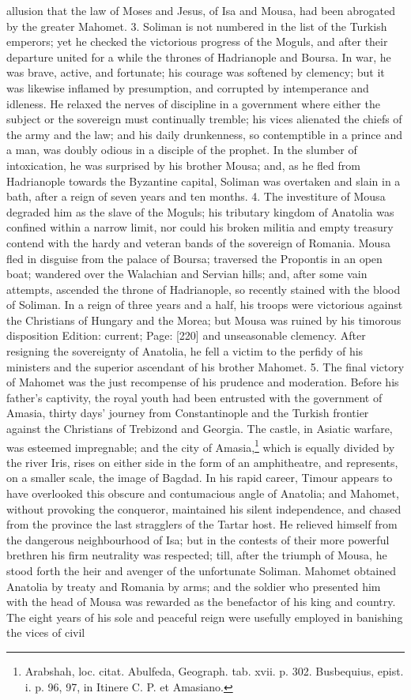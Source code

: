 allusion that the law of Moses and Jesus, of Isa and Mousa, had been abrogated by the greater Mahomet. 3. Soliman is not numbered in the list of the Turkish emperors; yet he checked the victorious progress of the Moguls, and after their departure united for a while the thrones of Hadrianople and Boursa. In war, he was brave, active, and fortunate; his courage was softened by clemency; but it was likewise inflamed by presumption, and corrupted by intemperance and idleness. He relaxed the nerves of discipline in a government where either the subject or the sovereign must continually tremble; his vices alienated the chiefs of the army and the law; and his daily drunkenness, so contemptible in a prince and a man, was doubly odious in a disciple of the prophet. In the slumber of intoxication, he was surprised by his brother Mousa; and, as he fled from Hadrianople towards the Byzantine capital, Soliman was overtaken and slain in a bath, after a reign of seven years and ten months. 4. The investiture of Mousa degraded him as the slave of the Moguls; his tributary kingdom of Anatolia was confined within a narrow limit, nor could his broken militia and empty treasury contend with the hardy and veteran bands of the sovereign of Romania. Mousa fled in disguise from the palace of Boursa; traversed the Propontis in an open boat; wandered over the Walachian and Servian hills; and, after some vain attempts, ascended the throne of Hadrianople, so recently stained with the blood of Soliman. In a reign of three years and a half, his troops were victorious against the Christians of Hungary and the Morea; but Mousa was ruined by his timorous disposition Edition: current; Page: [220] and unseasonable clemency. After resigning the sovereignty of Anatolia, he fell a victim to the perfidy of his ministers and the superior ascendant of his brother Mahomet. 5. The final victory of Mahomet was the just recompense of his prudence and moderation. Before his father\texthebrew{}’s captivity, the royal youth had been entrusted with the government of Amasia, thirty days\texthebrew{}’ journey from Constantinople and the Turkish frontier against the Christians of Trebizond and Georgia. The castle, in Asiatic warfare, was esteemed impregnable; and the city of Amasia,\footnote{Arabshah, loc. citat. Abulfeda, Geograph. tab. xvii. p. 302. Busbequius, epist. i. p. 96, 97, in Itinere C. P. et Amasiano.} which is equally divided by the river Iris, rises on either side in the form of an amphitheatre, and represents, on a smaller scale, the image of Bagdad. In his rapid career, Timour appears to have overlooked this obscure and contumacious angle of Anatolia; and Mahomet, without provoking the conqueror, maintained his silent independence, and chased from the province the last stragglers of the Tartar host. He relieved himself from the dangerous neighbourhood of Isa; but in the contests of their more powerful brethren his firm neutrality was respected; till, after the triumph of Mousa, he stood forth the heir and avenger of the unfortunate Soliman. Mahomet obtained Anatolia by treaty and Romania by arms; and the soldier who presented him with the head of Mousa was rewarded as the benefactor of his king and country. The eight years of his sole and peaceful reign were usefully employed in banishing the vices of civil 